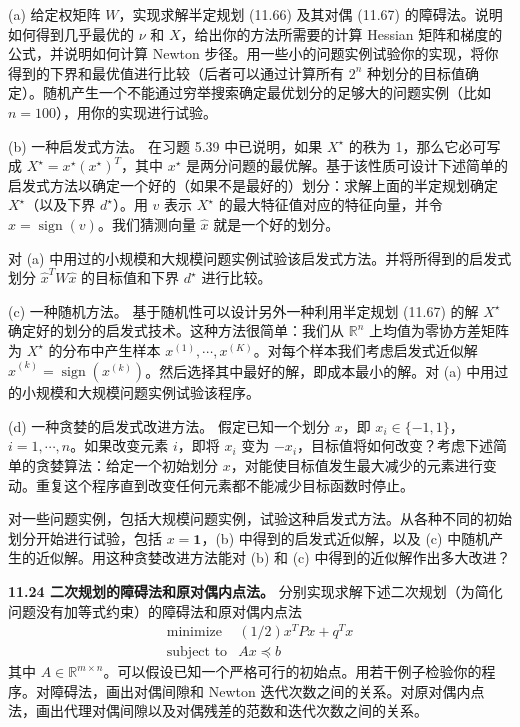 \documentclass[UTF8,12pt,a4paper,fontset=fandol]{ctexart}
\begin{document}
(a) 给定权矩阵 $W$，实现求解半定规划 (11.66) 及其对偶 (11.67) 的障碍法。说明如何得到几乎最优的 $\nu$ 和 $X$，给出你的方法所需要的计算 Hessian 矩阵和梯度的公式，并说明如何计算 Newton 步径。用一些小的问题实例试验你的实现，将你得到的下界和最优值进行比较（后者可以通过计算所有 $2^n$ 种划分的目标值确定）。随机产生一个不能通过穷举搜索确定最优划分的足够大的问题实例（比如 $n=100$），用你的实现进行试验。

(b) 一种启发式方法。 在习题 5.39 中已说明，如果 $X^\star$ 的秩为 1，那么它必可写成 $X^\star=x^\star(x^\star)^T$，其中 $x^\star$ 是两分问题的最优解。基于该性质可设计下述简单的启发式方法以确定一个好的（如果不是最好的）划分：求解上面的半定规划确定 $X^\star$（以及下界 $d^\star$）。用 $v$ 表示 $X^\star$ 的最大特征值对应的特征向量，并令 $\hat{x}=\operatorname{sign}(v)$。我们猜测向量 $\hat{x}$ 就是一个好的划分。

对 (a) 中用过的小规模和大规模问题实例试验该启发式方法。并将所得到的启发式划分 $\hat{x}^TW\hat{x}$ 的目标值和下界 $d^\star$ 进行比较。

(c) 一种随机方法。 基于随机性可以设计另外一种利用半定规划 (11.67) 的解 $X^\star$ 确定好的划分的启发式技术。这种方法很简单：我们从 $\mathbb{R}^n$ 上均值为零协方差矩阵为 $X^\star$ 的分布中产生样本 $x^{(1)},\cdots,x^{(K)}$。对每个样本我们考虑启发式近似解 $\hat{x}^{(k)}=\operatorname{sign}(x^{(k)})$。然后选择其中最好的解，即成本最小的解。对 (a) 中用过的小规模和大规模问题实例试验该程序。

(d) 一种贪婪的启发式改进方法。 假定已知一个划分 $x$，即 $x_i\in\{-1,1\}$，$i=1,\cdots,n$。如果改变元素 $i$，即将 $x_i$ 变为 $-x_i$，目标值将如何改变？考虑下述简单的贪婪算法：给定一个初始划分 $x$，对能使目标值发生最大减少的元素进行变动。重复这个程序直到改变任何元素都不能减少目标函数时停止。

对一些问题实例，包括大规模问题实例，试验这种启发式方法。从各种不同的初始划分开始进行试验，包括 $x=\mathbf{1}$，(b) 中得到的启发式近似解，以及 (c) 中随机产生的近似解。用这种贪婪改进方法能对 (b) 和 (c) 中得到的近似解作出多大改进？

\noindent\textbf{11.24 二次规划的障碍法和原对偶内点法。} 分别实现求解下述二次规划（为简化问题没有加等式约束）的障碍法和原对偶内点法
\[
\begin{array}{ll}
\text{minimize} & (1/2)x^TPx+q^Tx\\
\text{subject to} & Ax\preceq b
\end{array}
\]
其中 $A\in\mathbb{R}^{m\times n}$。可以假设已知一个严格可行的初始点。用若干例子检验你的程序。对障碍法，画出对偶间隙和 Newton 迭代次数之间的关系。对原对偶内点法，画出代理对偶间隙以及对偶残差的范数和迭代次数之间的关系。
\end{document}
